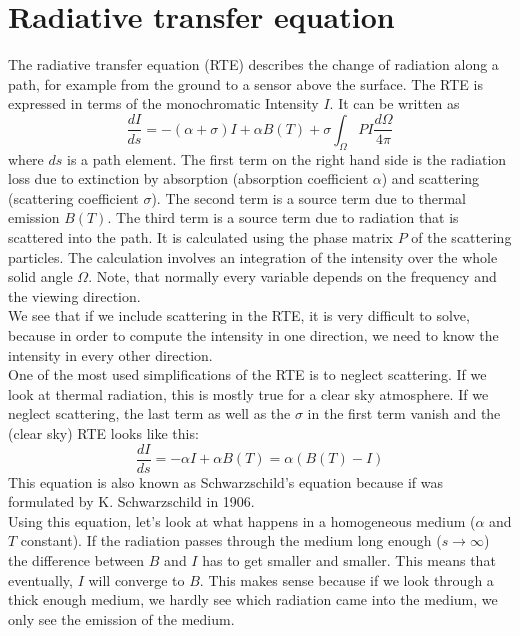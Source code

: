 \section{Radiative transfer equation}
The radiative transfer equation (RTE) describes the change of radiation along a path,
for example from the ground to a sensor above the surface. The RTE is expressed in 
terms of the monochromatic Intensity $I$. It can be written as
\begin{equation}
	\frac{dI}{ds} = - (\alpha + \sigma)I + \alpha B(T) + \sigma \int_\Omega PI 
	\frac{d\Omega}{4\pi}
\end{equation}
where $ds$ is a path element. The first term on the right hand side is 
the radiation loss due to extinction by absorption (absorption coefficient $\alpha$) 
and scattering (scattering coefficient $\sigma$). The second term is a source term
due to thermal emission $B(T)$. The third term is a source term due to radiation that
is scattered into the path. It is calculated using the phase matrix $P$ of the 
scattering particles. The calculation involves an integration of the intensity over the 
whole solid angle $\Omega$. Note, that normally every variable depends on the frequency
and the viewing direction. \\
We see that if we include scattering in the RTE, it is very difficult to solve, because 
in order to compute the intensity in one direction, we need to know the intensity in 
every other direction.\\
One of the most used simplifications of the RTE is to neglect scattering. If we look at
thermal radiation, this is mostly true for a clear sky atmosphere. If we neglect 
scattering, the last term as well as the $\sigma$ in the first term vanish and the 
(clear sky) RTE looks like this:
\begin{equation}
	\frac{dI}{ds} = -\alpha I + \alpha B(T) = \alpha ( B(T) - I )
\end{equation}
This equation is also known as Schwarzschild's equation because if was formulated by 
K. Schwarzschild in 1906.\\
Using this equation, let's look at what happens in a homogeneous medium ($\alpha$ and $T$
constant). If the radiation passes through the medium long enough ($s \rightarrow \infty$)
the difference between $B$ and $I$ has to get smaller and smaller. This means that eventually,
$I$ will converge to $B$. This makes sense because if we look through a thick enough medium, 
we hardly see which radiation came into the medium, we only see the emission of the medium.\\
